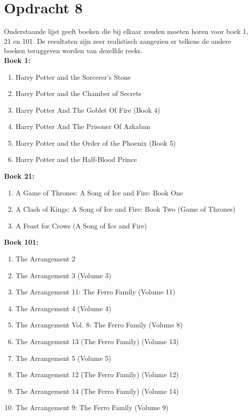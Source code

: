 \documentclass[11pt,a4paper]{article}
\begin{document}
\section*{Opdracht 8}
Onderstaande lijst geeft boeken die bij elkaar zouden moeten horen voor boek 1, 21 en 101.
De resultaten zijn zeer realistisch aangezien er telkens de andere boeken teruggeven worden van dezelfde reeks.\\
\textbf{Boek 1:}
\begin{enumerate}
\item Harry Potter and the Sorcerer's Stone
\item Harry Potter and the Chamber of Secrets
\item Harry Potter And The Goblet Of Fire (Book 4)
\item Harry Potter And The Prisoner Of Azkaban
\item Harry Potter and the Order of the Phoenix (Book 5)
\item Harry Potter and the Half-Blood Prince
\end{enumerate}
\textbf{Boek 21:}
\begin{enumerate}
\item A Game of Thrones: A Song of Ice and Fire: Book One
\item A Clash of Kings: A Song of Ice and Fire: Book Two (Game of Thrones)
\item A Feast for Crows (A Song of Ice and Fire)
\end{enumerate}
\textbf{Boek 101:}
\begin{enumerate}
\item The Arrangement 2
\item The Arrangement 3 (Volume 3)
\item The Arrangement 11: The Ferro Family  (Volume 11)
\item The Arrangement 4 (Volume 4)
\item The Arrangement Vol. 8: The Ferro Family (Volume 8)
\item The Arrangement 13 (The Ferro Family) (Volume 13)
\item The Arrangement 5 (Volume 5)
\item The Arrangement 12 (The Ferro Family) (Volume 12)
\item The Arrangement 14 (The Ferro Family) (Volume 14)
\item The Arrangement 9: The Ferro Family (Volume 9)
\end{enumerate}


\end{document}
